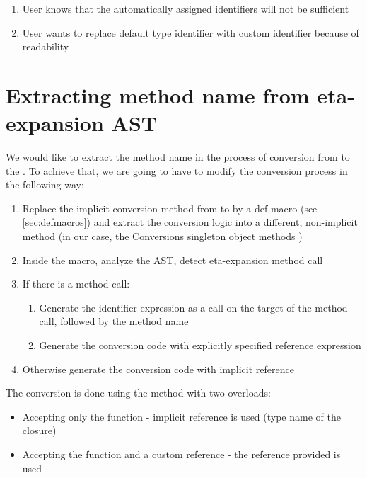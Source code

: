 \begin{enumerate}
	\item User knows that the automatically assigned identifiers will not be sufficient
	\item User wants to replace default type identifier with custom identifier because of readability
\end{enumerate}

\section{Extracting method name from eta-expansion AST}

We would like to extract the method name in the process of conversion from  to the . To achieve that, we are going to have to modify the conversion process in the following way:

\begin{enumerate}
	\item Replace the implicit conversion method from  to  by a def macro (see \ref{sec:defmacros}) and extract the conversion logic into a different, non-implicit method (in our case, the Conversions singleton object methods )
	\item Inside the macro, analyze the AST, detect eta-expansion method call
	\item If there is a method call:
	\begin{enumerate}
		\item Generate the identifier expression as a  call on the target of the method call, followed by the method name
		\item Generate the conversion code with explicitly specified reference expression
	\end{enumerate}
	\item Otherwise generate the conversion code with implicit reference	
\end{enumerate}

The conversion is done using the  method with two overloads:
\begin{itemize}
	\item Accepting only the function - implicit reference is used (type name of the closure)
	\item Accepting the function and a custom reference - the reference provided is used
\end{itemize}

